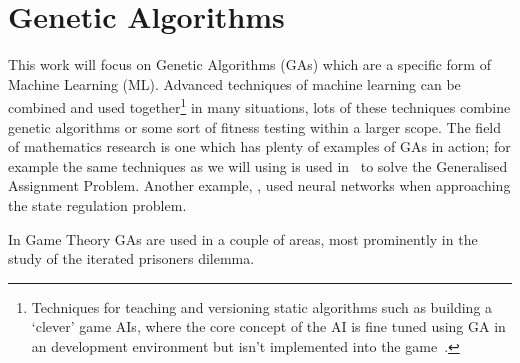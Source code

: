\section{Genetic Algorithms}
This work will focus on Genetic Algorithms (GAs) which are a specific form of Machine Learning (ML).
Advanced techniques of machine learning can be combined and used together\footnote{Techniques for teaching and versioning static algorithms such as building a `clever' game AIs, where the core concept of the AI is fine tuned using GA in an development environment but isn't implemented into the game~\cite{bakkes2009rapid}.} in many situations, lots of these techniques combine genetic algorithms or some sort of fitness testing within a larger scope.
The field of mathematics research is one which has plenty of examples of GAs in action;
for example the same techniques as we will using is used in~\cite{chu1997genetic} to solve the Generalised Assignment Problem.
Another example, \cite{bhanu1995adaptive}, used neural networks when approaching the state regulation problem.

In Game Theory GAs are used in a couple of areas, most prominently in the study of the iterated prisoners dilemma.